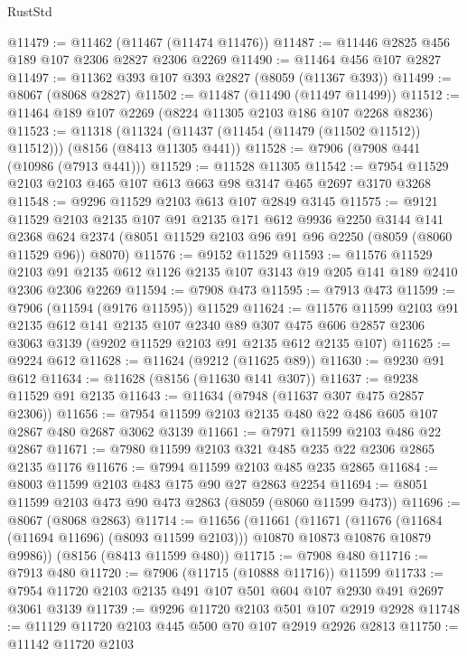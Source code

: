 \begin{lexlean}{RustStd}
\begin{coremodule}
@11479 := @11462 (@11467 (@11474 @11476))
@11487 := @11446 @2825 @456 @189 @107 @2306 @2827 @2306 @2269
@11490 := @11464 @456 @107 @2827
@11497 := @11362 @393 @107 @393 @2827 (@8059 (@11367 @393))
@11499 := @8067 (@8068 @2827)
@11502 := @11487 (@11490 (@11497 @11499))
@11512 := @11464 @189 @107 @2269 (@8224 @11305 @2103 @186 @107 @2268 @8236)
@11523 := @11318
    (@11324 (@11437 (@11454 (@11479 (@11502 @11512)) @11512)))
    (@8156 (@8413 @11305 @441))
@11528 := @7906 (@7908 @441 (@10986 (@7913 @441)))
@11529 := @11528 @11305
@11542 := @7954 @11529 @2103 @2103 @465 @107 @613 @663 @98 @3147 @465 @2697 @3170 @3268
@11548 := @9296 @11529 @2103 @613 @107 @2849 @3145
@11575 := @9121
    @11529
    @2103
    @2135
    @107
    @91
    @2135
    @171
    @612
    @9936
    @2250
    @3144
    @141
    @2368
    @624
    @2374
    (@8051 @11529 @2103 @96 @91 @96 @2250 (@8059 (@8060 @11529 @96)) @8070)
@11576 := @9152 @11529
@11593 := @11576
    @11529
    @2103
    @91
    @2135
    @612
    @1126
    @2135
    @107
    @3143
    @19
    @205
    @141
    @189
    @2410
    @2306
    @2306
    @2269
@11594 := @7908 @473
@11595 := @7913 @473
@11599 := @7906 (@11594 (@9176 @11595)) @11529
@11624 := @11576
    @11599
    @2103
    @91
    @2135
    @612
    @141
    @2135
    @107
    @2340
    @89
    @307
    @475
    @606
    @2857
    @2306
    @3063
    @3139
    (@9202 @11529 @2103 @91 @2135 @612 @2135 @107)
@11625 := @9224 @612
@11628 := @11624 (@9212 (@11625 @89))
@11630 := @9230 @91 @612
@11634 := @11628 (@8156 (@11630 @141 @307))
@11637 := @9238 @11529 @91 @2135
@11643 := @11634 (@7948 (@11637 @307 @475 @2857 @2306))
@11656 := @7954 @11599 @2103 @2135 @480 @22 @486 @605 @107 @2867 @480 @2687 @3062 @3139
@11661 := @7971 @11599 @2103 @486 @22 @2867
@11671 := @7980 @11599 @2103 @321 @485 @235 @22 @2306 @2865 @2135 @1176
@11676 := @7994 @11599 @2103 @485 @235 @2865
@11684 := @8003 @11599 @2103 @483 @175 @90 @27 @2863 @2254
@11694 := @8051 @11599 @2103 @473 @90 @473 @2863 (@8059 (@8060 @11599 @473))
@11696 := @8067 (@8068 @2863)
@11714 := @11656
    (@11661
      (@11671
        (@11676 (@11684 (@11694 @11696) (@8093 @11599 @2103)))
        @10870
        @10873
        @10876
        @10879
        @9986))
    (@8156 (@8413 @11599 @480))
@11715 := @7908 @480
@11716 := @7913 @480
@11720 := @7906 (@11715 (@10888 @11716)) @11599
@11733 := @7954 @11720 @2103 @2135 @491 @107 @501 @604 @107 @2930 @491 @2697 @3061 @3139
@11739 := @9296 @11720 @2103 @501 @107 @2919 @2928
@11748 := @11129 @11720 @2103 @445 @500 @70 @107 @2919 @2926 @2813
@11750 := @11142 @11720 @2103

\end{coremodule}
\end{lexlean}
